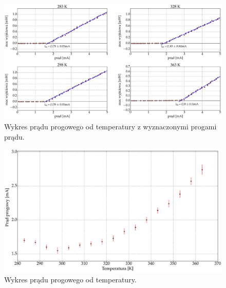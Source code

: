 \begin{figure}
\center
  \includegraphics[scale=0.30]{plot_vcsel_850/plot_fit_i_th.eps}
  \caption{Wykres prądu progowego od temperatury z wyznaczonymi progami prądu.}
  \label{fig:rys5}
\end{figure}
\begin{figure}
\center
  \includegraphics[scale=0.30]{plot_vcsel_850/plot_temp_i_th.eps}
  \caption{Wykres prądu progowego od temperatury.}
  \label{fig:rys6}
\end{figure}
